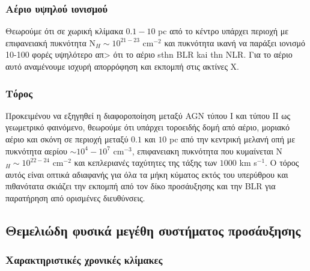 \subsubsection*{Αέριο υψηλού ιονισμού}

Θεωρούμε ότι σε χωρική κλίμακα $0.1-10 $ \textlatin{pc} από το κέντρο υπάρχει περιοχή με επιφανειακή πυκνότητα Ν$_{Η} \sim 10^{21-23}$ \textlatin{cm}$^{-2}$ και πυκνότητα ικανή να παράξει ιονισμό 10-100 φορές υψηλότερο απ> ότι το αέριο sthn \textlatin{BLR} kai thn \textlatin{NLR.} Για το αέριο αυτό αναμένουμε ισχυρή απορρόφηση και εκπομπή στις ακτίνες Χ\cite{netzer_2013}.

\subsubsection*{Τόρος}
Προκειμένου να εξηγηθεί η διαφοροποίηση μεταξύ \textlatin{AGN} τύπου Ι και τύπου ΙΙ ως γεωμετρικό φαινόμενο, θεωρούμε ότι υπάρχει τοροειδής δομή από αέριο, μοριακό αέριο και σκόνη σε περιοχή μεταξύ $0.1$ και $10$ \textlatin{pc} από την κεντρική μελανή οπή με πυκνότητα αερίου $\sim 10^{4}-10^{7}$ \textlatin{cm}$^{-3}$, επιφανειακη πυκνότητα που κυμαίνεται N$_{H} \sim 10^{22-24}$ \textlatin{cm}$^{-2}$ και κεπλεριανές ταχύτητες της τάξης των $1000$ \textlatin{km  s}$^{-1}$. Ο τόρος αυτός είναι οπτικά αδιαφανής για όλα τα μήκη κύματος εκτός του υπερύθρου και πιθανότατα σκιάζει την εκπομπή από τον δίκο προσάυξησης και την \textlatin{BLR} για παρατήρηση από ορισμένες διευθύνσεις\cite{netzer_2013}.

\subsection{Θεμελιώδη φυσικά μεγέθη συστήματος προσάυξησης}

\subsubsection*{Χαρακτηριστικές χρονικές κλίμακες}

